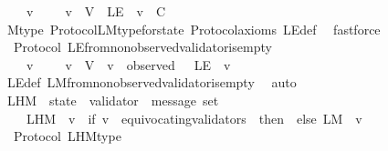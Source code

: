 \begin{isabellebody}
\ \ {\isachardoublequoteopen}{\isasymforall}\ {\isasymsigma}\ v{\isachardot}\ {\isasymsigma}\ {\isasymin}\ {\isasymSigma}\ {\isasymand}\ v\ {\isasymin}\ V\ {\isasymlongrightarrow}\ L{\isacharunderscore}E\ {\isasymsigma}\ v\ {\isasymsubseteq}\ C{\isachardoublequoteclose}\isanewline
%
\isadelimproof
\ \ %
\endisadelimproof
%
\isatagproof
{}\isamarkupfalse%
\ M{\isacharunderscore}type\ Protocol{\isachardot}L{\isacharunderscore}M{\isacharunderscore}type{\isacharunderscore}for{\isacharunderscore}state\ Protocol{\isacharunderscore}axioms\ L{\isacharunderscore}E{\isacharunderscore}def\ \isamarkupfalse%
\ fastforce%
\endisatagproof
{\isafoldproof}%
%
\isadelimproof
\isanewline
%
\endisadelimproof
\isanewline
{}\isamarkupfalse%
\ {\isacharparenleft}\ Protocol{\isacharparenright}\ L{\isacharunderscore}E{\isacharunderscore}from{\isacharunderscore}non{\isacharunderscore}observed{\isacharunderscore}validator{\isacharunderscore}is{\isacharunderscore}empty\ {\isacharcolon}\isanewline
\ \ {\isachardoublequoteopen}{\isasymforall}\ {\isasymsigma}\ v{\isachardot}\ {\isasymsigma}\ {\isasymin}\ {\isasymSigma}\ {\isasymand}\ v\ {\isasymin}\ V\ {\isasymand}\ v\ {\isasymnotin}\ observed\ {\isasymsigma}\ {\isasymlongrightarrow}\ L{\isacharunderscore}E\ {\isasymsigma}\ v\ {\isacharequal}\ {\isasymemptyset}{\isachardoublequoteclose}\isanewline
%
\isadelimproof
\ \ %
\endisadelimproof
%
\isatagproof
{}\isamarkupfalse%
\ L{\isacharunderscore}E{\isacharunderscore}def\ L{\isacharunderscore}M{\isacharunderscore}from{\isacharunderscore}non{\isacharunderscore}observed{\isacharunderscore}validator{\isacharunderscore}is{\isacharunderscore}empty\ \isamarkupfalse%
\ auto%
\endisatagproof
{\isafoldproof}%
%
\isadelimproof
\isanewline
%
\endisadelimproof
\isanewline
\isanewline
\isanewline
\isanewline
\isanewline
{}\isamarkupfalse%
\ L{\isacharunderscore}H{\isacharunderscore}M\ {\isacharcolon}{\isacharcolon}\ {\isachardoublequoteopen}state\ {\isasymRightarrow}\ validator\ {\isasymRightarrow}\ message\ set{\isachardoublequoteclose}\isanewline
\ \ \isanewline
\ \ \ \ {\isachardoublequoteopen}L{\isacharunderscore}H{\isacharunderscore}M\ {\isasymsigma}\ v\ {\isacharequal}\ {\isacharparenleft}if\ v\ {\isasymin}\ equivocating{\isacharunderscore}validators\ {\isasymsigma}\ then\ {\isasymemptyset}\ else\ L{\isacharunderscore}M\ {\isasymsigma}\ v{\isacharparenright}{\isachardoublequoteclose}\isanewline
\isanewline
{}\isamarkupfalse%
\ {\isacharparenleft}\ Protocol{\isacharparenright}\ L{\isacharunderscore}H{\isacharunderscore}M{\isacharunderscore}type\ {\isacharcolon}\isanewline

\end{isabellebody}
